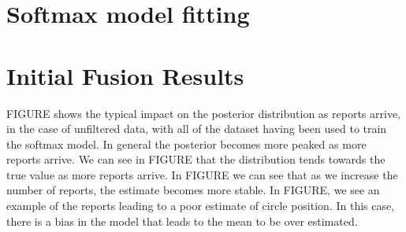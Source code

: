 \section{Softmax model fitting}



\section{Initial Fusion Results}




FIGURE shows the typical impact on the posterior distribution as reports arrive, in the case of unfiltered data, with all of the dataset having been used to train the softmax model. In general the posterior becomes more peaked as more reports arrive. We can see in FIGURE that the distribution tends towards the true value as more reports arrive. In FIGURE we can see that as we increase the number of reports, the estimate becomes more stable. In FIGURE, we see an example of the reports leading to a poor estimate of circle position. In this case, there is a bias in the model that leads to the mean to be over estimated.  






